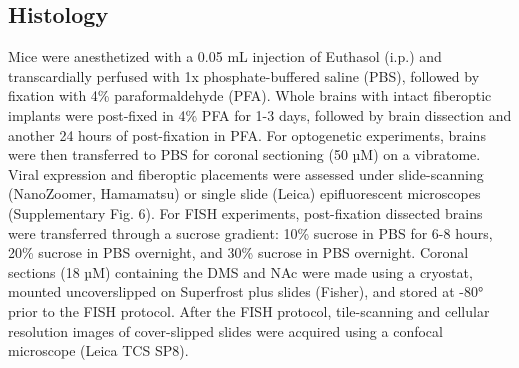 \subsection{Histology}
\label{sec:ap1:m12}
Mice were anesthetized with a 0.05 mL injection of Euthasol (i.p.) and transcardially perfused with 1x phosphate-buffered saline (PBS), followed by fixation with 4\% paraformaldehyde (PFA). Whole brains with intact fiberoptic implants were post-fixed in 4\% PFA for 1-3 days, followed by brain dissection and another 24 hours of post-fixation in PFA. For optogenetic experiments, brains were then transferred to PBS for coronal sectioning (50 µM) on a vibratome. Viral expression and fiberoptic placements were assessed under slide-scanning (NanoZoomer, Hamamatsu) or single slide (Leica) epifluorescent microscopes (Supplementary Fig. 6). For FISH experiments, post-fixation dissected brains were transferred through a sucrose gradient: 10\% sucrose in PBS for 6-8 hours, 20\% sucrose in PBS overnight, and 30\% sucrose in PBS overnight. Coronal sections (18 µM) containing the DMS and NAc were made using a cryostat, mounted uncoverslipped on Superfrost plus slides (Fisher), and stored at -80° prior to the FISH protocol. After the FISH protocol, tile-scanning and cellular resolution images of cover-slipped slides were acquired using a confocal microscope (Leica TCS SP8).